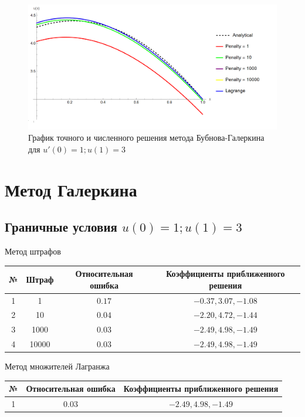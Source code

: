 \documentclass[12pt,a4paper]{article}
\begin{document}
	\begin{figure}[h]
		\centering
		\includegraphics[width=1\textwidth]{m-1-3.PNG}
		\caption{График точного и численного решения метода Бубнова-Галеркина для $u'(0) = 1; u(1) = 3$}
	\end{figure}

    \pagebreak

    \section{ Метод Галеркина}

   	\subsection{Граничные условия $u(0) = 1; u(1) = 3$}

\begin{center}
	Метод штрафов
\begin{tabular}{|c|c|c|c|} 
	\hline
	№ & Штраф & Относительная ошибка & Коэффициенты приближенного решения \\ 
	\hline
	1 & 1 &$0.17$ & ${-0.37,3.07,-1.08}$ \\ 
	\hline
	2 & 10 &$0.04$ & ${-2.20,4.72,-1.44}$ \\ 
	\hline
	3 & 1000 &$0.03$ & ${-2.49,4.98,-1.49}$ \\ 
	\hline
	4 & 10000 &$0.03$ & ${-2.49,4.98,-1.49}$ \\ 
	\hline
\end{tabular}
\end{center}

\begin{center}
Метод множителей Лагранжа
\begin{tabular}{|c|c|c|} 
	\hline
	№ & Относительная ошибка & Коэффициенты приближенного решения \\ 
	\hline
	1 & $0.03$ & ${-2.49,4.98,-1.49}$ \\ 
	\hline
\end{tabular}
\end{center}
\end{document}
